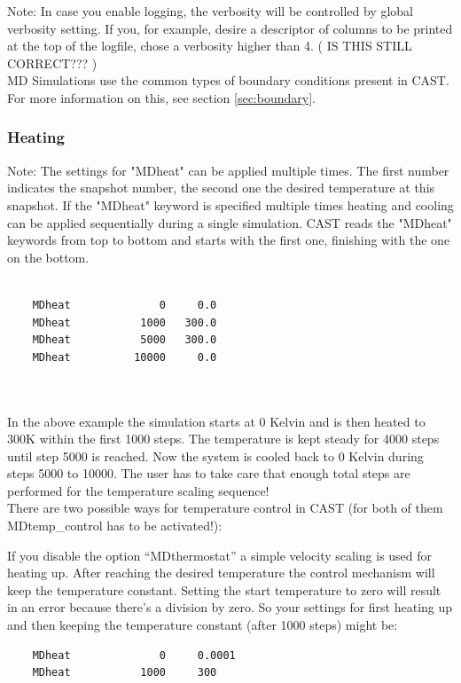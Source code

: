 \documentclass[10pt,a4paper]{article} %
\newif\ifverbose %
\begin{document}
	Note: In case you enable logging, the verbosity will be controlled by global verbosity setting. If you, for example, desire a descriptor of columns to be printed at the top of the logfile, chose a verbosity higher than 4. (	IS THIS STILL CORRECT??? ) \\
	
	\ac{MD} Simulations use the common types of boundary conditions present in \ac{CAST}. For more information on this, see section \ref{sec:boundary}.

	\ifverbose
	\subsubsection{Heating}
	Note: The settings for "MDheat" can be applied multiple times. The first number indicates the snapshot number, the second one the desired temperature at this snapshot. If the "MDheat" keyword is specified multiple times heating and cooling can be applied sequentially during a single simulation. \ac{CAST} reads the "MDheat" keywords from top to bottom and starts with the first one, finishing with the one on the bottom.\\~\\
	\begin{lstlisting}
	MDheat			    0  	  0.0
	MDheat 			 1000   300.0
	MDheat			 5000   300.0
	MDheat			10000     0.0
	\end{lstlisting}~\\~\\
	In the above example the simulation starts at 0 Kelvin and is then heated to 300K within the first 1000 steps. The temperature is kept steady for 4000 steps until step 5000 is reached. Now the system is cooled back to 0 Kelvin during steps 5000 to 10000. The user has to take care that enough total steps are performed for the temperature scaling sequence!\\
	
	There are two possible ways for temperature control in CAST (for both of them MDtemp\_control has to be activated!): 

If you disable the option ``MDthermostat'' a simple velocity scaling is used for heating up. After reaching the desired temperature the control mechanism will keep the temperature constant. Setting the start temperature to zero will result in an error because there's a division by zero. So your settings for first heating up and then keeping the temperature constant (after 1000 steps) might be:
	\begin{lstlisting}
	MDheat			    0  	  0.0001
	MDheat 			 1000     300
	\end{lstlisting}
\end{document}
